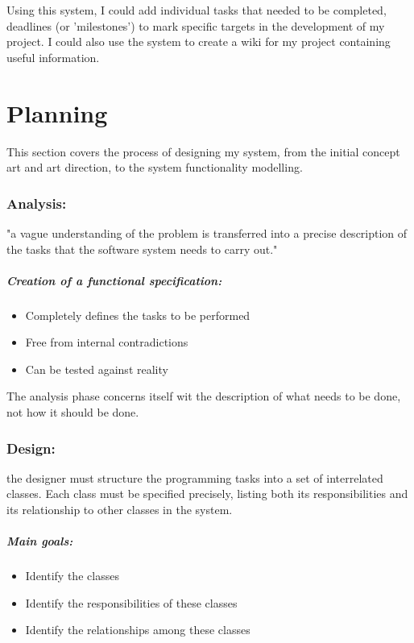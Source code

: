 \documentclass[a4paper,oneside]{report}
\begin{document}
Using this system, I could add individual tasks that needed to be completed, deadlines (or 'milestones') to mark specific targets in the development of my project. I could also use the system to create a wiki for my project containing useful information. 

%
%
\part{Planning}{This section covers the process of designing my system, from the initial concept art and art direction, to the system functionality modelling.}

\section{Analysis:} "a vague understanding of the problem is transferred into a precise description of the tasks that the software system needs to carry out."

\subsubsection{Creation of a functional specification:}
\begin{itemize}
\item Completely defines the tasks to be performed
\item Free from internal contradictions 
\item Can be tested against reality
\end{itemize}

The analysis phase concerns itself wit the description of what needs to be done, not how it should be done.

\section{Design:} the designer must structure the programming tasks into a set of interrelated classes. Each class must be specified precisely, listing both its responsibilities and its relationship to other classes in the system.

\subsubsection{Main goals:}
\begin{itemize}
\item Identify the classes
\item Identify the responsibilities of these classes
\item Identify the relationships among these classes
\end{itemize}
\end{document}
